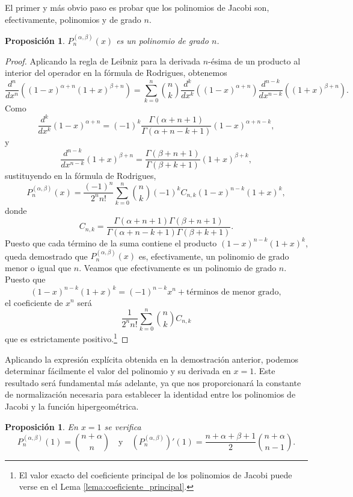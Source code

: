 \documentclass[12pt,a4paper]{book}
\newtheorem{prop}[theorem]{Proposición}
\begin{document}
El primer y más obvio paso es probar que los polinomios de Jacobi son, efectivamente, polinomios y de grado $n$.

\begin{prop}
    \label{prop:jacobi_es_polinomio}
$P_n^{(\alpha, \beta)}(x)$ es un polinomio de grado $n$.
\end{prop}
\begin{proof}
Aplicando la regla de Leibniz para la derivada $n$-ésima de un producto al interior del operador en la fórmula de Rodrigues, obtenemos
\[
\frac{d^n}{dx^n} ((1-x)^{\alpha+n} (1+x)^{\beta+n}) = \sum_{k=0}^n \binom{n}{k} \frac{d^k}{dx^k} \left( (1-x)^{\alpha+n} \right) \frac{d^{n-k}}{dx^{n-k}} \left( (1+x)^{\beta+n} \right).
\]
Como
\[
    \frac{d^k}{dx^k} (1-x)^{\alpha+n} =  (-1)^k \frac{\Gamma(\alpha+n+1)}{\Gamma(\alpha+n-k+1)} (1-x)^{\alpha+n-k},
\]
y 
\[
    \frac{d^{n-k}}{dx^{n-k}} (1+x)^{\beta+n} = \frac{\Gamma(\beta+n+1)}{\Gamma(\beta+k+1)} (1+x)^{\beta+k},
\]
sustituyendo en la fórmula de Rodrigues,
\begin{equation}
\label{sum_jacobi}
    P_n^{(\alpha, \beta)}(x) = \frac{(-1)^n}{2^n n!} \sum_{k=0}^n \binom{n}{k} (-1)^k C_{n,k} (1-x)^{n-k} (1+x)^k,
\end{equation}
donde
\[
C_{n,k} = \frac{\Gamma(\alpha+n+1)\Gamma(\beta+n+1)}{\Gamma(\alpha+n-k+1)\Gamma(\beta+k+1)}.
\]
Puesto que cada término de la suma contiene el producto $(1-x)^{n-k}(1+x)^k$, queda demostrado que $P_n^{(\alpha, \beta)}(x)$ es, efectivamente, un polinomio de grado menor o igual que $n$.
Veamos que efectivamente es un polinomio de grado $n$. Puesto que
\[
(1-x)^{n-k} (1+x)^k = (-1)^{n-k} x^n + \text{términos de menor grado},
\]
el coeficiente de $x^n$ será 
\[
\frac{1}{2^n n!}\sum_{k=0}^{n}\binom{n}{k} C_{n,k}
\]
que es estrictamente positivo.\footnote{El valor exacto del coeficiente principal de los polinomios de Jacobi puede verse en el Lema \ref{lema:coeficiente_principal}.}
\end{proof}

Aplicando la expresión explícita obtenida en la demostración anterior, podemos determinar fácilmente el valor del polinomio y su derivada en $x=1$. Este resultado será fundamental más adelante, ya que nos proporcionará la constante de normalización necesaria para establecer la identidad entre los polinomios de Jacobi y la función hipergeométrica.

\begin{prop}
\label{prop:valor_en_1}
En $x=1$ se verifica
\begin{equation*}
    P_n^{(\alpha, \beta)}(1) = \binom{n+\alpha}{n} \quad \text{y} \quad (P_n^{(\alpha, \beta)})'(1) = \frac{n+\alpha+\beta+1}{2} \binom{n+\alpha}{n-1}.
\end{equation*}
\end{prop}
\end{document}
